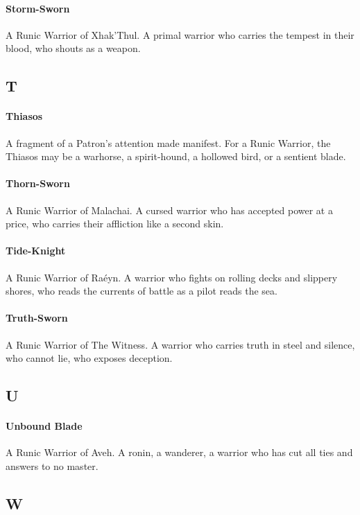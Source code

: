 \paragraph{Storm-Sworn}
A Runic Warrior of Xhak'Thul. A primal warrior who carries the tempest in their blood, who shouts as a weapon.

\subsection*{T}

\paragraph{Thiasos}
A fragment of a Patron's attention made manifest. For a Runic Warrior, the Thiasos may be a warhorse, a spirit-hound, a hollowed bird, or a sentient blade.

\paragraph{Thorn-Sworn}
A Runic Warrior of Malachai. A cursed warrior who has accepted power at a price, who carries their affliction like a second skin.

\paragraph{Tide-Knight}
A Runic Warrior of Raéyn. A warrior who fights on rolling decks and slippery shores, who reads the currents of battle as a pilot reads the sea.

\paragraph{Truth-Sworn}
A Runic Warrior of The Witness. A warrior who carries truth in steel and silence, who cannot lie, who exposes deception.

\subsection*{U}

\paragraph{Unbound Blade}
A Runic Warrior of Aveh. A ronin, a wanderer, a warrior who has cut all ties and answers to no master.

\subsection*{W}

